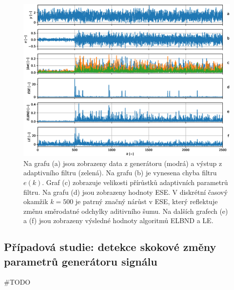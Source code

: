 \begin{figure}[ht!] 
    \centering
    \includegraphics[scale=0.60]{IMG/mdpi/noise_change.eps}
    \caption{Na grafu (a) jsou zobrazeny data z generátoru (modrá) a výstup z adaptivního filtru (zelená). Na grafu (b) je vynesena chyba filtru $e(k)$. Graf (c) zobrazuje velikosti přírůstků adaptivních parametrů filtru. Na grafu (d) jsou zobrazeny hodnoty ESE. V diskrétní časový okamžik $k=500$ je patrný značný nárůst v ESE, který reflektuje změnu směrodatné odchylky aditivního šumu. Na dalších grafech (e) a (f) jsou zobrazeny výsledné hodnoty algoritmů ELBND a LE.}
    \label{fig:noise_changed}
\end{figure}

\subsection{Případová studie: detekce skokové změny parametrů generátoru signálu}
\#TODO
